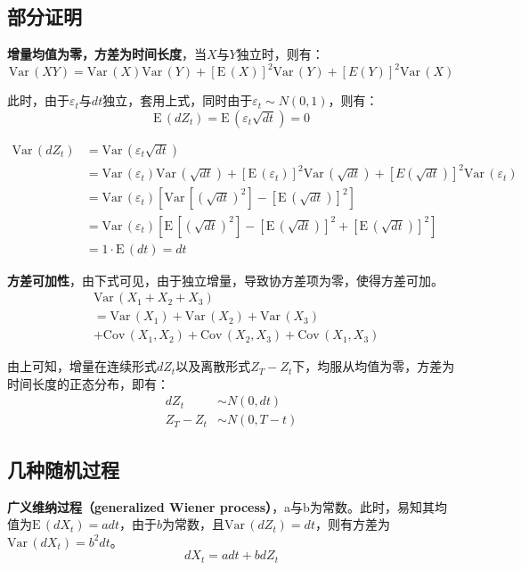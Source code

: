 \documentclass[11pt]{article}
\def\Var{{\textrm{Var}}\,}
\def\Cov{{\textrm{Cov}}\,}
\def\E{{\textrm{E}}\,}
\begin{document}
\subsection{部分证明}

\textbf{增量均值为零，方差为时间长度}，当$X$与$Y$独立时，则有：
\begin{equation*}
    \Var(XY) = \Var(X)\Var(Y) + [\E(X)]^2 \Var(Y) + [E(Y)]^2 \Var(X)
\end{equation*}

此时，由于$\varepsilon_t$与$dt$独立，套用上式，同时由于$\varepsilon_t \sim N(0,1)$，则有：
\begin{equation*}
    \E(dZ_t) = \E(\varepsilon_t \sqrt{dt}) = 0
\end{equation*}

\begin{align*}
    \Var(dZ_t) & = \Var( \varepsilon_t \sqrt{dt}) \\
    & =  \Var(\varepsilon_t) \Var(\sqrt{dt}) + [\E(\varepsilon_t)]^2 \Var(\sqrt{dt}) + [E(\sqrt{dt})]^2 \Var(\varepsilon_t) \\
    & = \Var(\varepsilon_t) \left[ \Var[(\sqrt{dt})^2] - [\E(\sqrt{dt})]^2 \right] \\
    & = \Var(\varepsilon_t) \left[ \E[(\sqrt{dt})^2] - [\E(\sqrt{dt})]^2 + [\E(\sqrt{dt})]^2 \right] \\
    & = 1 \cdot \E(dt) = dt
\end{align*}

\textbf{方差可加性}，由下式可见，由于独立增量，导致协方差项为零，使得方差可加。
\begin{align*}
     & \Var(X_1+X_2+X_3) \\
     & = \Var(X_1) + \Var(X_2) + \Var(X_3) \\
     & + \Cov(X_1,X_2) + \Cov(X_2,X_3) + \Cov(X_1,X_3)
\end{align*}

由上可知，增量在连续形式$dZ_t$以及离散形式$Z_T-Z_t$下，均服从均值为零，方差为时间长度的正态分布，即有：
\begin{align*}
    dZ_t & \sim N(0,dt) \\
    Z_T - Z_t & \sim N(0,T-t)
\end{align*}

\subsection{几种随机过程}

\textbf{广义维纳过程（generalized Wiener process）}，a与b为常数。此时，易知其均值为$\E(dX_t) = adt$，由于$b$为常数，且$\Var(dZ_t)=dt$，则有方差为$\Var(dX_t)=b^2 dt$。
\begin{equation*}
    dX_t =a dt + b dZ_t
\end{equation*}
\end{document}
